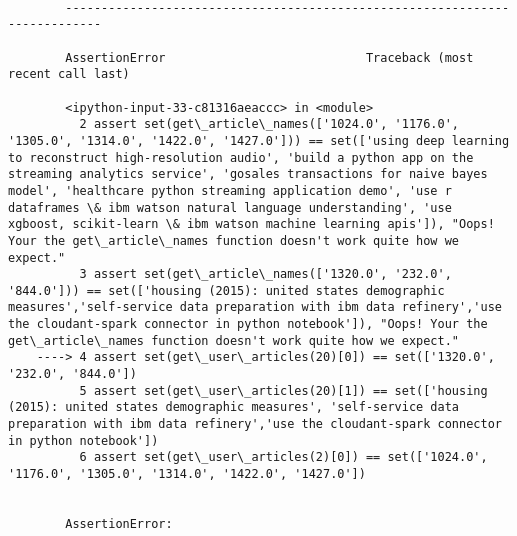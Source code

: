 \documentclass[11pt]{article}
\begin{document}
    \begin{Verbatim}[commandchars=\\\{\}]

        ---------------------------------------------------------------------------

        AssertionError                            Traceback (most recent call last)

        <ipython-input-33-c81316aeaccc> in <module>
          2 assert set(get\_article\_names(['1024.0', '1176.0', '1305.0', '1314.0', '1422.0', '1427.0'])) == set(['using deep learning to reconstruct high-resolution audio', 'build a python app on the streaming analytics service', 'gosales transactions for naive bayes model', 'healthcare python streaming application demo', 'use r dataframes \& ibm watson natural language understanding', 'use xgboost, scikit-learn \& ibm watson machine learning apis']), "Oops! Your the get\_article\_names function doesn't work quite how we expect."
          3 assert set(get\_article\_names(['1320.0', '232.0', '844.0'])) == set(['housing (2015): united states demographic measures','self-service data preparation with ibm data refinery','use the cloudant-spark connector in python notebook']), "Oops! Your the get\_article\_names function doesn't work quite how we expect."
    ----> 4 assert set(get\_user\_articles(20)[0]) == set(['1320.0', '232.0', '844.0'])
          5 assert set(get\_user\_articles(20)[1]) == set(['housing (2015): united states demographic measures', 'self-service data preparation with ibm data refinery','use the cloudant-spark connector in python notebook'])
          6 assert set(get\_user\_articles(2)[0]) == set(['1024.0', '1176.0', '1305.0', '1314.0', '1422.0', '1427.0'])
    

        AssertionError: 

    \end{Verbatim}
\end{document}
